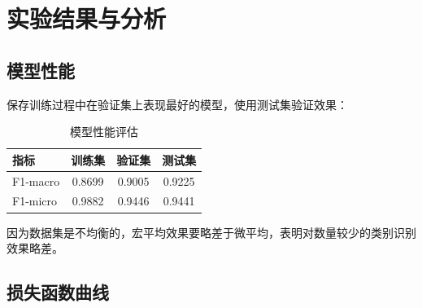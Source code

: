 \documentclass{article}
\begin{document}
	\section{实验结果与分析}
	
	\subsection{模型性能}
	保存训练过程中在验证集上表现最好的模型，使用测试集验证效果：
	
	\begin{table}[h]
		\centering
		\caption{模型性能评估}
		\begin{tabular}{lccc}
			\toprule
			\textbf{指标} & \textbf{训练集} & \textbf{验证集} & \textbf{测试集} \\
			\midrule
			F1-macro & 0.8699 & 0.9005 & 0.9225 \\
			F1-micro & 0.9882 & 0.9446 & 0.9441 \\
			\bottomrule
		\end{tabular}
	\end{table}
	
	因为数据集是不均衡的，宏平均效果要略差于微平均，表明对数量较少的类别识别效果略差。
	
	\subsection{损失函数曲线}
\end{document}

